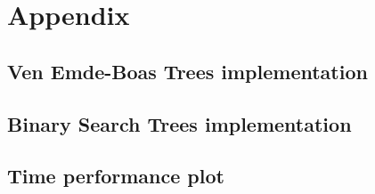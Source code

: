 \documentclass[10pt,a4paper,hidelinks]{article}
\begin{document}

\tableofcontents








\section{Appendix}
\subsection{Ven Emde-Boas Trees implementation}
\label{appendix:veb}


\subsection{Binary Search Trees implementation}
\label{appendix:bst}


\subsection{Time performance plot}
\label{appendix:time_performance_plot}

\newpage
\listoffigures
\lstlistoflistings
\end{document}
